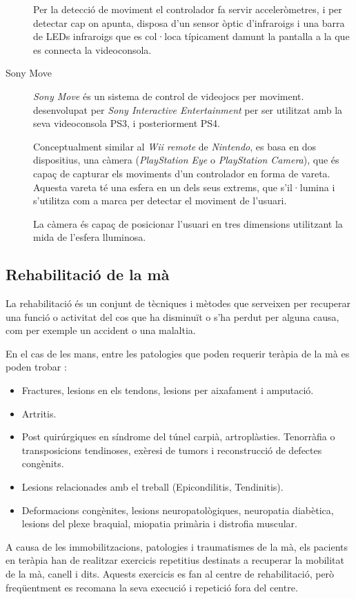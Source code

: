 \documentclass[12pt,a4paper,catalan]{article}
\begin{document}
\begin{description}
		Per la detecció de moviment el controlador fa servir acceleròmetres, i per detectar cap on apunta, disposa d'un sensor òptic d'infraroigs i una barra de LEDs infraroigs que es col·loca típicament damunt la pantalla a la que es connecta la videoconsola.
		\item[Sony Move] \textit{Sony Move} és un sistema de control de videojocs per moviment. desenvolupat per \textit{Sony Interactive Entertainment} per ser utilitzat amb la seva videoconsola PS3, i posteriorment PS4.
		
		Conceptualment similar al \textit{Wii remote} de \textit{Nintendo}, es basa en dos dispositius, una càmera (\textit{PlayStation Eye} o \textit{PlayStation Camera}), que és capaç de capturar els moviments d'un controlador en forma de vareta. Aquesta vareta té una esfera en un dels seus extrems, que s'il·lumina i s'utilitza com a marca per detectar el moviment de l'usuari.
		
		La càmera és capaç de posicionar l'usuari en tres dimensions utilitzant la mida de l'esfera lluminosa.
	\end{description}
	\subsection{Rehabilitació de la mà}
	La rehabilitació és un conjunt de tècniques i mètodes que serveixen per recuperar una funció o activitat del cos que ha disminuït o s'ha perdut per alguna causa, com per exemple un accident o una malaltia.
	
	En el cas de les mans, entre les patologies que poden requerir teràpia de la mà es poden trobar \cite{rehab-principles}:
	\begin{itemize}
		\item Fractures, lesions en els tendons, lesions per aixafament i amputació.
		\item Artritis.
		\item Post quirúrgiques en síndrome del túnel carpià, artroplàsties. Tenorràfia o transposicions tendinoses, exèresi de tumors i reconstrucció de defectes congènits.
		\item Lesions relacionades amb el treball (Epicondilitis, Tendinitis).
		\item Deformacions congènites, lesions neuropatològiques, neuropatia diabètica, lesions del plexe braquial, miopatia primària i distrofia muscular.
	\end{itemize}
	A causa de les immobilitzacions, patologies i traumatismes de la mà, els pacients en teràpia han de realitzar exercicis repetitius destinats a recuperar la mobilitat de la mà, canell i dits. Aquests exercicis es fan al centre de rehabilitació, però freqüentment es recomana la seva execució i repetició fora del centre.
	
\end{document}
